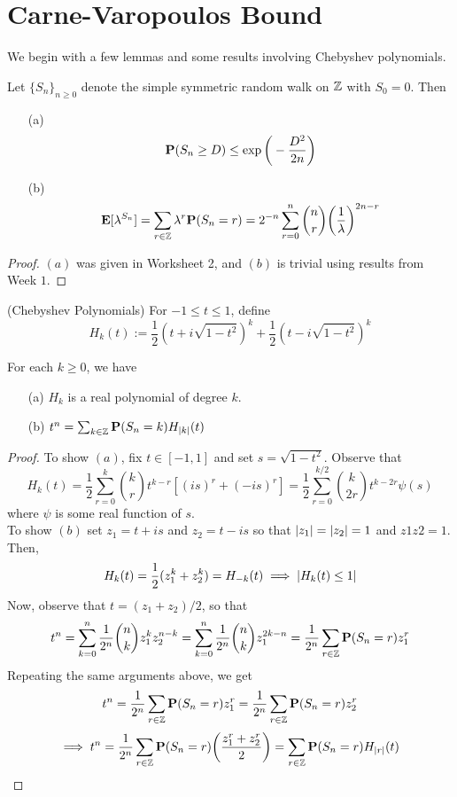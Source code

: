 \documentclass[main]{subfiles}
\begin{document}
\section{Carne-Varopoulos Bound}
We begin with a few lemmas and some results involving Chebyshev polynomials.
\begin{lemma}
	Let $\{S_n\}_{n\ge 0}$ denote the simple symmetric random walk on $\Z$ with $S_0=0$. Then
	\begin{itemize}
		\item[(a)] \[\P(S_n\ge D)\le \exp\bigg(-\frac{D^2}{2n}\bigg)\]
		\item[(b)] \[\E[\lambda^{S_n}]=\sum_{r\in\Z}\lambda^r\P(S_n=r)=2^{-n}\sum_{r=0}^n\binom{n}{r}\bigg(\frac{1}{\lambda}\bigg)^{2n-r}\]
	\end{itemize}
\end{lemma}
\begin{proof}
	$(a)$ was given in Worksheet 2, and $(b)$ is trivial using results from Week $1$.
\end{proof}
\begin{definition}
	(Chebyshev Polynomials) For $-1\le t\le 1$, define
	\[H_k(t):=\frac{1}{2}(t+i\sqrt{1-t^2})^k+\frac{1}{2}(t-i\sqrt{1-t^2})^k\]
\end{definition}
\begin{lemma}
	For each $k\ge 0$, we have
	\begin{itemize}
		\item[(a)]$H_k$ is a real polynomial of degree $k$.
		\item[(b)]$t^n=\sum_{k\in\Z}\P(S_n=k)H_{\Mod{k}}(t)$
	\end{itemize}
\end{lemma}
\begin{proof}
	To show $(a)$, fix $t\in[-1,1]$ and set $s=\sqrt{1-t^2}$. Observe that
	\[H_k(t)=\frac{1}{2}\sum_{r=0}^k\binom{k}{r}t^{k-r}[(is)^r+(-is)^r]=\frac{1}{2}\sum_{r=0}^{k/2}\binom{k}{2r}t^{k-2r}\psi(s)\]
	where $\psi$ is some real function of $s$.\\
	To show $(b)$ set $z_1=t+is$ and $z_2=t-is$ so that $\Mod{z_1}=\Mod{z_2}=1$ and $z1z2=1$. Then,
	\[H_k(t)=\frac{1}{2}(z_1^k+z_2^k)=H_{-k}(t)\implies \Mod{H_k(t)\le 1}\]
	Now, observe that $t=(z_1+z_2)/2$, so that
	\[t^n=\sum_{k=0}^n\frac{1}{2^n}\binom{n}{k}z_1^kz_2^{n-k}=\sum_{k=0}^n\frac{1}{2^n}\binom{n}{k}z_1^{2k-n}=\frac{1}{2^n}\sum_{r\in\Z}\P(S_n=r)z_1^r\]
	Repeating the same arguments above, we get
	\[t^n=\frac{1}{2^n}\sum_{r\in\Z}\P(S_n=r)z_1^r=\frac{1}{2^n}\sum_{r\in\Z}\P(S_n=r)z_2^r\]
	\[\implies t^n=\frac{1}{2^n}\sum_{r\in\Z}\P(S_n=r)\bigg(\frac{z_1^r+z_2^r}{2}\bigg)=\sum_{r\in\Z}\P(S_n=r)H_{\Mod{r}}(t)\]
\end{proof}
\end{document}
